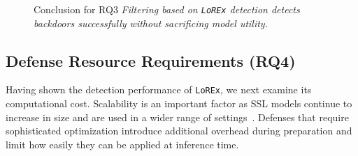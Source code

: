 \documentclass[letterpaper,twocolumn,10pt]{article}
\begin{document}
\begin{figure}[H]
\centering
\begin{rqconclusion}{Conclusion for RQ3}
\textit{Filtering based on \texttt{LoREx} detection detects backdoors successfully without sacrificing model utility.}
\end{rqconclusion}
\vspace{-0.25cm}
\end{figure}
\subsection{Defense Resource Requirements (RQ4)}
\label{exp_resource}

\begin{table}[h]
    \centering
    \caption{Resource consumption on CIFAR-10 (ResNet-18). Memory is measured as VRAM for GPU methods and RAM for CPU methods. Latency is per-sample average during inference.}
    \label{tab:resource_benchmarks}
\end{table}

Having shown the detection performance of \texttt{LoREx}, we next examine its computational cost. 
Scalability is an important factor as SSL models continue to increase in size and are used in a wider range of settings~\cite{abad2025soklinedefensebackdoor}. 
Defenses that require sophisticated optimization introduce additional overhead during preparation and limit how easily they can be applied at inference time.
\end{document}
